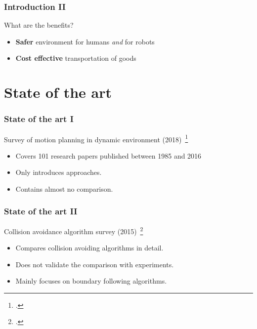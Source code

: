 \documentclass{beamer}
\begin{document}
\begin{frame}
    \frametitle{\huge{Introduction II}}
    \begin{block}{What are the benefits?}
        \begin{itemize}
            \item \textbf{Safer} environment for humans \textit{and} for robots
            \item \textbf{Cost effective} transportation of goods
        \end{itemize} 
    \end{block}
\end{frame}

\section{State of the art}
\begin{frame}
    \frametitle{\huge{State of the art I}}
    \begin{block}{Survey of motion planning in dynamic environment (2018)~\footcite{mohanan2018a}}
        \begin{itemize}
            \color{blue} \item Covers 101 research papers published between 1985 and 2016
            \color{red}  \item Only introduces approaches. 
            \color{red}  \item Contains almost no comparison.
        \end{itemize}
    \end{block}
\end{frame}

\begin{frame}
    \frametitle{\huge{State of the art II}}
    \begin{block}{Collision avoidance algorithm survey (2015)~\footcite{hoy2015algorithms}}
        \begin{itemize}
            \color{blue} \item Compares collision avoiding algorithms in detail.
            \color{red}  \item Does not validate the comparison with experiments.
            \color{red}  \item Mainly focuses on boundary following algorithms.
        \end{itemize}
    \end{block}
\end{frame}
\end{document}
